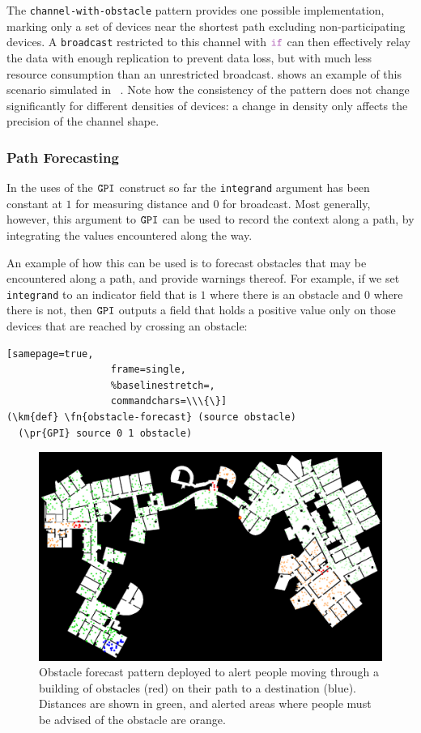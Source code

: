 \documentclass[12pt,a4paper,twoside,openright]{book}
\begin{document}
The {\tt channel-with-obstacle} pattern provides one possible implementation, marking only a set of devices near the shortest path excluding non-participating devices.
%
A {\tt broadcast} restricted to this channel with $\ifN$ can then effectively relay the data with enough replication to prevent data loss, but with much less resource consumption than an unrestricted broadcast.
%
 shows an example of this scenario simulated in \alchemist{}~\cite{alchemist-jos2013}.
%
Note how the consistency of the pattern does not change significantly for different densities of devices: a change in density only affects the precision of the channel shape.

\subsubsection{Path Forecasting}

In the uses of the $\texttt{GPI}$ construct so far the {\tt integrand} argument has been constant at $1$ for measuring distance and $0$ for broadcast.
%
Most generally, however, this argument to $\texttt{GPI}$ can be used to record the context along a path, by integrating the values encountered along the way.

An example of how this can be used is to forecast obstacles that may be encountered along a path, and provide warnings thereof.  
%
For example, if we set {\tt integrand} to an indicator field that is $1$ where there is an obstacle and $0$ where there is not, then $\texttt{GPI}$ outputs a field that holds a positive value only on those devices that are reached by crossing an obstacle:
\begin{Verbatim}[samepage=true,
                  frame=single,
                  %baselinestretch=,
                  commandchars=\\\{\}]
(\km{def} \fn{obstacle-forecast} (source obstacle)
  (\pr{GPI} source 0 1 obstacle)
\end{Verbatim}

\begin{figure}
\centering
\includegraphics[width=\columnwidth]{img/shots-5-mit}
\caption[Indoor obstacle forecast]{Obstacle forecast pattern deployed to alert people moving through a building of obstacles (red) on their path to a destination (blue).
%
Distances are shown in green, and alerted areas where people must be advised of the obstacle are orange.}
\label{f:sector}
\end{figure}
\end{document}
